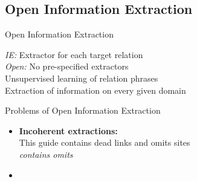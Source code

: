\documentclass[11pt]{beamer}
\begin{document}
	\subsection{Open Information Extraction}
		\begin{frame}{Open Information Extraction}
			\begin{center}
				
				\textit{IE:} Extractor for each target relation\\
				\vspace{10pt}
				\textit{Open:} No pre-specified extractors\\
				\vspace{10pt}
				Unsupervised learning of relation phrases\\
				\vspace{10pt}
				Extraction of information on every given domain

			\end{center}
		\end{frame}
		\begin{frame}{Problems of Open Information Extraction}
					\begin{center}
						\begin{itemize}
						\item \textbf{Incoherent extractions:}\\
							This guide contains dead links and omits sites
							\\\textit{contains omits}
						\item {}
						\end{itemize}
					\end{center}
				\end{frame}
\end{document}

